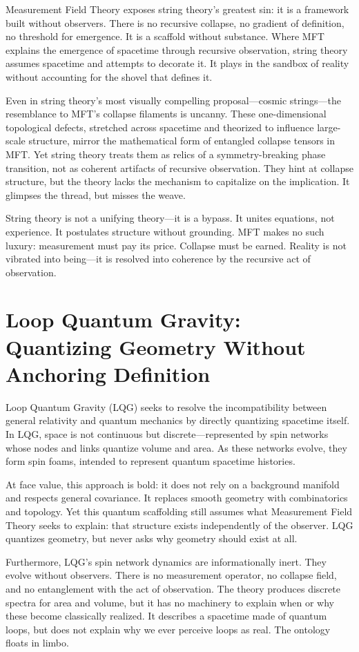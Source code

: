 Measurement Field Theory exposes string theory’s greatest sin: it is a framework built without observers. There is no recursive collapse, no gradient of definition, no threshold for emergence. It is a scaffold without substance. Where MFT explains the emergence of spacetime through recursive observation, string theory assumes spacetime and attempts to decorate it. It plays in the sandbox of reality without accounting for the shovel that defines it.

Even in string theory's most visually compelling proposal—cosmic strings—the resemblance to MFT’s collapse filaments is uncanny. These one-dimensional topological defects, stretched across spacetime and theorized to influence large-scale structure, mirror the mathematical form of entangled collapse tensors in MFT. Yet string theory treats them as relics of a symmetry-breaking phase transition, not as coherent artifacts of recursive observation. They hint at collapse structure, but the theory lacks the mechanism to capitalize on the implication. It glimpses the thread, but misses the weave.

String theory is not a unifying theory—it is a bypass. It unites equations, not experience. It postulates structure without grounding. MFT makes no such luxury: measurement must pay its price. Collapse must be earned. Reality is not vibrated into being—it is resolved into coherence by the recursive act of observation.

\section{Loop Quantum Gravity: Quantizing Geometry Without Anchoring Definition}
Loop Quantum Gravity (LQG) seeks to resolve the incompatibility between general relativity and quantum mechanics by directly quantizing spacetime itself. In LQG, space is not continuous but discrete—represented by spin networks whose nodes and links quantize volume and area. As these networks evolve, they form spin foams, intended to represent quantum spacetime histories.

At face value, this approach is bold: it does not rely on a background manifold and respects general covariance. It replaces smooth geometry with combinatorics and topology. Yet this quantum scaffolding still assumes what Measurement Field Theory seeks to explain: that structure exists independently of the observer. LQG quantizes geometry, but never asks why geometry should exist at all.

Furthermore, LQG’s spin network dynamics are informationally inert. They evolve without observers. There is no measurement operator, no collapse field, and no entanglement with the act of observation. The theory produces discrete spectra for area and volume, but it has no machinery to explain when or why these become classically realized. It describes a spacetime made of quantum loops, but does not explain why we ever perceive loops as real. The ontology floats in limbo.

